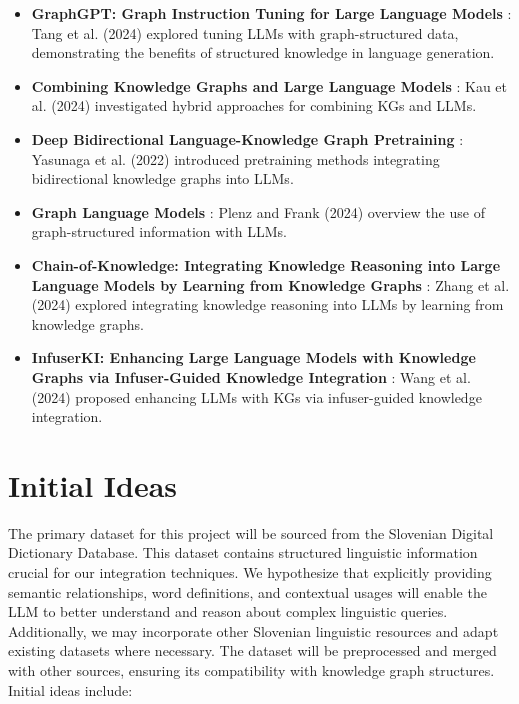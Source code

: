 \documentclass[fleqn,moreauthors,10pt]{ds_report}
\begin{document}
\begin{itemize}[noitemsep]
    \item \textbf{GraphGPT: Graph Instruction Tuning for Large Language Models} \cite{Tang2024GraphGPT}: Tang et al. (2024) explored tuning LLMs with graph-structured data, demonstrating the benefits of structured knowledge in language generation.
    \item \textbf{Combining Knowledge Graphs and Large Language Models} \cite{Kau2024CombiningKGLLM}: Kau et al. (2024) investigated hybrid approaches for combining KGs and LLMs.
    \item \textbf{Deep Bidirectional Language-Knowledge Graph Pretraining} \cite{Yasunaga2022DBLP}: Yasunaga et al. (2022) introduced pretraining methods integrating bidirectional knowledge graphs into LLMs.
    \item \textbf{Graph Language Models} \cite{Plenz2024GLM}: Plenz and Frank (2024) overview the use of graph-structured information with LLMs.
    \item \textbf{Chain-of-Knowledge: Integrating Knowledge Reasoning into Large Language Models by Learning from Knowledge Graphs} \cite{Zhang2024CoK}: Zhang et al. (2024) explored integrating knowledge reasoning into LLMs by learning from knowledge graphs.
    \item \textbf{InfuserKI: Enhancing Large Language Models with Knowledge Graphs via Infuser-Guided Knowledge Integration} \cite{Wang2024InfuserKI}: Wang et al. (2024) proposed enhancing LLMs with KGs via infuser-guided knowledge integration.
\end{itemize}

\section*{Initial Ideas}

The primary dataset for this project will be sourced from the Slovenian Digital Dictionary Database. This dataset contains structured linguistic information crucial for our integration techniques. We hypothesize that explicitly providing semantic relationships, word definitions, and contextual usages will enable the LLM to better understand and reason about complex linguistic queries. Additionally, we may incorporate other Slovenian linguistic resources and adapt existing datasets where necessary. The dataset will be preprocessed and merged with other sources, ensuring its compatibility with knowledge graph structures. Initial ideas include:
\end{document}
